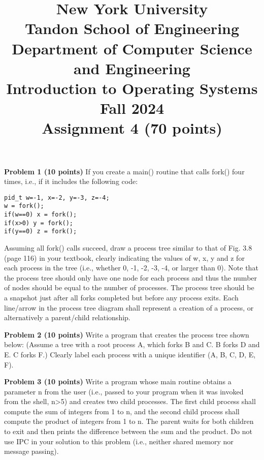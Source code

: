 \documentclass{article}
\begin{document}
\title{New York University \\ Tandon School of Engineering \\ Department of Computer Science and Engineering \\ Introduction to Operating Systems \\ Fall 2024 \\ Assignment 4 (70 points)}
\date{}
\maketitle

\textbf{Problem 1 (10 points)} If you create a main() routine that calls fork() four times, i.e., if it includes the following code:

\texttt{pid\_t w=-1, x=-2, y=-3, z=-4; \\ w = fork(); \\ if(w==0) x = fork(); \\ if(x>0) y = fork(); \\ if(y==0) z = fork();}

Assuming all fork() calls succeed, draw a process tree similar to that of Fig. 3.8 (page 116) in your textbook, clearly indicating the values of w, x, y and z for each process in the tree (i.e., whether 0, -1, -2, -3, -4, or larger than 0). Note that the process tree should only have one node for each process and thus the number of nodes should be equal to the number of processes. The process tree should be a snapshot just after all forks completed but before any process exits. Each line/arrow in the process tree diagram shall represent a creation of a process, or alternatively a parent/child relationship.


\textbf{Problem 2 (10 points)} Write a program that creates the process tree shown below:  (Assume a tree with a root process A, which forks B and C. B forks D and E. C forks F.)  Clearly label each process with a unique identifier (A, B, C, D, E, F).


\textbf{Problem 3 (10 points)} Write a program whose main routine obtains a parameter n from the user (i.e., passed to your program when it was invoked from the shell, n>5) and creates two child processes.  The first child process shall compute the sum of integers from 1 to n, and the second child process shall compute the product of integers from 1 to n. The parent waits for both children to exit and then prints the difference between the sum and the product. Do not use IPC in your solution to this problem (i.e., neither shared memory nor message passing).
\end{document}
